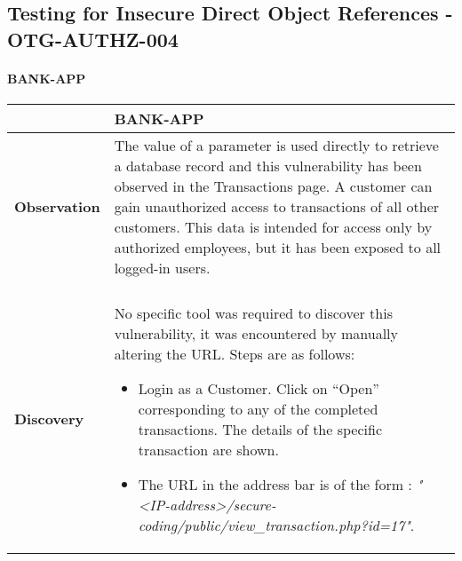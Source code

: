 \subsection{Testing for Insecure Direct Object References - OTG-AUTHZ-004}

\paragraph{BANK-APP} \mbox{}
\begin{longtable*}{p{.20\textwidth} | p{.80\textwidth}}
    \hline
    & \textbf{BANK-APP} \\
    \hline
    \textbf{Observation} &
	The value of a parameter is used directly to retrieve a database record and this vulnerability has been observed in the Transactions page.
	A customer can gain unauthorized access to transactions of all other customers. This data is intended for access only by authorized employees, but it has been exposed to all logged-in users. 
    \\\\
    \textbf{Discovery} &
       No specific tool was required to discover this vulnerability, it was encountered by manually altering the URL. Steps are as follows: 
       \begin{itemize}
	       \item  Login as a Customer. Click on “Open” corresponding to any of the completed transactions. The details of the specific transaction are shown.
	       
	       \item The URL in the address bar is of the form : \textit{"<IP-address>/secure-coding/public/view\_transaction.php?id=17"}. 
	       

\end{itemize}
\end{longtable*}
